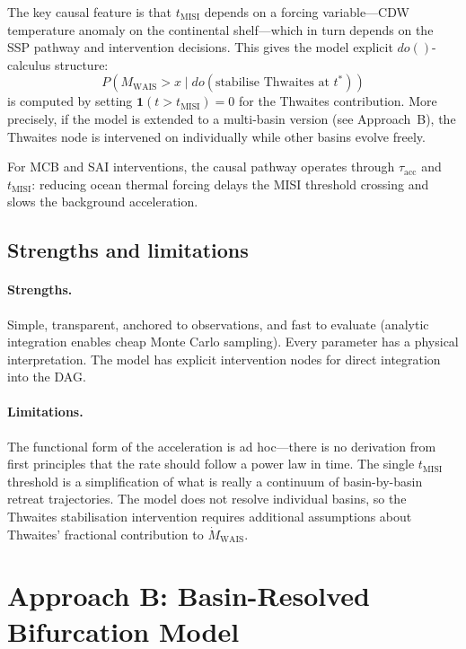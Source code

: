 \documentclass[11pt]{article}
\newcommand{\Ind}{\mathbf{1}}
\newcommand{\WAIS}{\text{WAIS}}
\newcommand{\MISI}{\text{MISI}}
\begin{document}
The key causal feature is that $t_{\MISI}$ depends on a forcing variable---CDW temperature anomaly on the continental shelf---which in turn depends on the SSP pathway and intervention decisions.  This gives the model explicit $do()$-calculus structure:
\begin{equation}
  P\!\left(M_{\WAIS} > x \mid do(\text{stabilise Thwaites at } t^*)\right)
\end{equation}
is computed by setting $\Ind(t > t_{\MISI}) = 0$ for the Thwaites contribution.  More precisely, if the model is extended to a multi-basin version (see Approach~B), the Thwaites node is intervened on individually while other basins evolve freely.

For MCB and SAI interventions, the causal pathway operates through $\tau_{\text{acc}}$ and $t_{\MISI}$: reducing ocean thermal forcing delays the MISI threshold crossing and slows the background acceleration.

\subsection{Strengths and limitations}

\paragraph{Strengths.}  Simple, transparent, anchored to observations, and fast to evaluate (analytic integration enables cheap Monte Carlo sampling).  Every parameter has a physical interpretation.  The model has explicit intervention nodes for direct integration into the DAG.

\paragraph{Limitations.}  The functional form of the acceleration is ad hoc---there is no derivation from first principles that the rate should follow a power law in time.  The single $t_{\MISI}$ threshold is a simplification of what is really a continuum of basin-by-basin retreat trajectories.  The model does not resolve individual basins, so the Thwaites stabilisation intervention requires additional assumptions about Thwaites' fractional contribution to $\dot{M}_{\WAIS}$.


\section{Approach B: Basin-Resolved Bifurcation Model}
\label{sec:approach_b}
\end{document}
